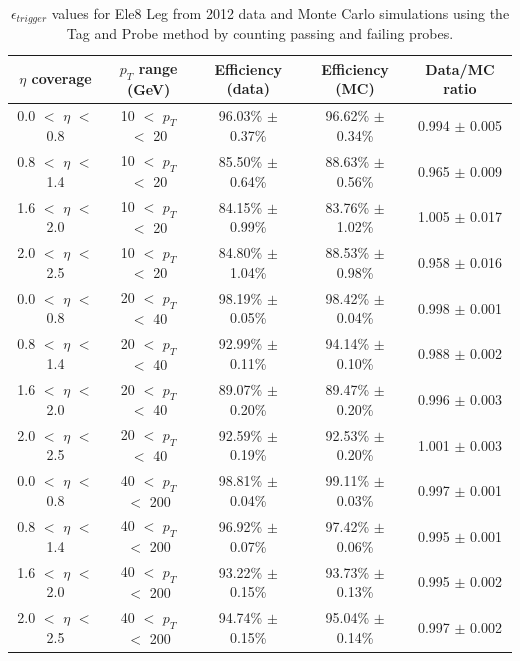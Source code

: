 \begin{table}[htb]
\caption{%
    $\epsilon_{trigger}$ values for Ele8 Leg from 2012 data and Monte Carlo simulations using the Tag and Probe method by counting passing and failing probes.
}
\begin{center}

     \begin{tabular}{ | c | c | c | c | c |}
      \hline
      $\eta$ coverage & $p_T$ range (GeV) & Efficiency (data) & Efficiency (MC) & Data/MC ratio \\ \hline \hline
      0.0 $<$ $\eta$ $<$ 0.8 & 10 $<$ $p_T$ $<$ 20 & 96.03\% $\pm$ 0.37\% & 96.62\% $\pm$ 0.34\% & 0.994 $\pm$ 0.005 \\ \hline
      0.8 $<$ $\eta$ $<$ 1.4 & 10 $<$ $p_T$ $<$ 20 & 85.50\% $\pm$ 0.64\% & 88.63\% $\pm$ 0.56\% & 0.965 $\pm$ 0.009 \\ \hline
      1.6 $<$ $\eta$ $<$ 2.0 & 10 $<$ $p_T$ $<$ 20 & 84.15\% $\pm$ 0.99\% & 83.76\% $\pm$ 1.02\% & 1.005 $\pm$ 0.017 \\ \hline
      2.0 $<$ $\eta$ $<$ 2.5 & 10 $<$ $p_T$ $<$ 20 & 84.80\% $\pm$ 1.04\% & 88.53\% $\pm$ 0.98\% & 0.958 $\pm$ 0.016 \\ \hline
      \hline
      0.0 $<$ $\eta$ $<$ 0.8 & 20 $<$ $p_T$ $<$ 40 & 98.19\% $\pm$ 0.05\% & 98.42\% $\pm$ 0.04\% & 0.998 $\pm$ 0.001 \\ \hline
      0.8 $<$ $\eta$ $<$ 1.4 & 20 $<$ $p_T$ $<$ 40 & 92.99\% $\pm$ 0.11\% & 94.14\% $\pm$ 0.10\% & 0.988 $\pm$ 0.002 \\ \hline
      1.6 $<$ $\eta$ $<$ 2.0 & 20 $<$ $p_T$ $<$ 40 & 89.07\% $\pm$ 0.20\% & 89.47\% $\pm$ 0.20\% & 0.996 $\pm$ 0.003 \\ \hline
      2.0 $<$ $\eta$ $<$ 2.5 & 20 $<$ $p_T$ $<$ 40 & 92.59\% $\pm$ 0.19\% & 92.53\% $\pm$ 0.20\% & 1.001 $\pm$ 0.003 \\ \hline
      \hline
      0.0 $<$ $\eta$ $<$ 0.8 & 40 $<$ $p_T$ $<$ 200 & 98.81\% $\pm$ 0.04\% & 99.11\% $\pm$ 0.03\% & 0.997 $\pm$ 0.001 \\ \hline
      0.8 $<$ $\eta$ $<$ 1.4 & 40 $<$ $p_T$ $<$ 200 & 96.92\% $\pm$ 0.07\% & 97.42\% $\pm$ 0.06\% & 0.995 $\pm$ 0.001 \\ \hline
      1.6 $<$ $\eta$ $<$ 2.0 & 40 $<$ $p_T$ $<$ 200 & 93.22\% $\pm$ 0.15\% & 93.73\% $\pm$ 0.13\% & 0.995 $\pm$ 0.002 \\ \hline
      2.0 $<$ $\eta$ $<$ 2.5 & 40 $<$ $p_T$ $<$ 200 & 94.74\% $\pm$ 0.15\% & 95.04\% $\pm$ 0.14\% & 0.997 $\pm$ 0.002 \\ \hline
      \end{tabular}
\end{center}
\label{tab:tagandprobe_8}
\end{table}

